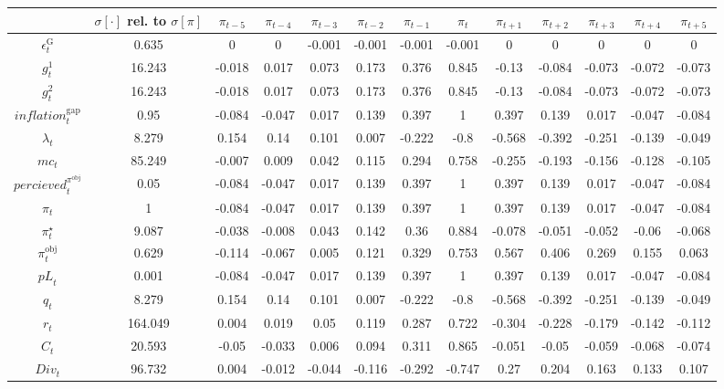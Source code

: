 \begin{tabular}{c|c|c|c|c|c|c|c|c|c|c|c|c|}
  & $\sigma[\cdot]$ rel. to $\sigma[\pi]$ & $\pi_{t-5}$ & $\pi_{t-4}$ & $\pi_{t-3}$ & $\pi_{t-2}$ & $\pi_{t-1}$ & $\pi_{t}$ & $\pi_{t+1}$ & $\pi_{t+2}$ & $\pi_{t+3}$ & $\pi_{t+4}$ & $\pi_{t+5}$\\
\hline
$\epsilon^{\mathrm{G}}_{t}$ & 0.635 & 0 & 0 & -0.001 & -0.001 & -0.001 & -0.001 & 0 & 0 & 0 & 0 & 0 \\
$g^{\mathrm{1}}_{t}$ & 16.243 & -0.018 & 0.017 & 0.073 & 0.173 & 0.376 & 0.845 & -0.13 & -0.084 & -0.073 & -0.072 & -0.073 \\
$g^{\mathrm{2}}_{t}$ & 16.243 & -0.018 & 0.017 & 0.073 & 0.173 & 0.376 & 0.845 & -0.13 & -0.084 & -0.073 & -0.072 & -0.073 \\
${i\!n\!f\!l\!a\!t\!i\!o\!n}^{\mathrm{gap}}_{t}$ & 0.95 & -0.084 & -0.047 & 0.017 & 0.139 & 0.397 & 1 & 0.397 & 0.139 & 0.017 & -0.047 & -0.084 \\
$\lambda_{t}$ & 8.279 & 0.154 & 0.14 & 0.101 & 0.007 & -0.222 & -0.8 & -0.568 & -0.392 & -0.251 & -0.139 & -0.049 \\
${m\!c}_{t}$ & 85.249 & -0.007 & 0.009 & 0.042 & 0.115 & 0.294 & 0.758 & -0.255 & -0.193 & -0.156 & -0.128 & -0.105 \\
${p\!e\!r\!c\!i\!e\!v\!e\!d}^{\pi^{\mathrm{obj}}}_{t}$ & 0.05 & -0.084 & -0.047 & 0.017 & 0.139 & 0.397 & 1 & 0.397 & 0.139 & 0.017 & -0.047 & -0.084 \\
$\pi_{t}$ & 1 & -0.084 & -0.047 & 0.017 & 0.139 & 0.397 & 1 & 0.397 & 0.139 & 0.017 & -0.047 & -0.084 \\
$\pi^{\star}_{t}$ & 9.087 & -0.038 & -0.008 & 0.043 & 0.142 & 0.36 & 0.884 & -0.078 & -0.051 & -0.052 & -0.06 & -0.068 \\
$\pi^{\mathrm{obj}}_{t}$ & 0.629 & -0.114 & -0.067 & 0.005 & 0.121 & 0.329 & 0.753 & 0.567 & 0.406 & 0.269 & 0.155 & 0.063 \\
${p\!L}_{t}$ & 0.001 & -0.084 & -0.047 & 0.017 & 0.139 & 0.397 & 1 & 0.397 & 0.139 & 0.017 & -0.047 & -0.084 \\
$q_{t}$ & 8.279 & 0.154 & 0.14 & 0.101 & 0.007 & -0.222 & -0.8 & -0.568 & -0.392 & -0.251 & -0.139 & -0.049 \\
$r_{t}$ & 164.049 & 0.004 & 0.019 & 0.05 & 0.119 & 0.287 & 0.722 & -0.304 & -0.228 & -0.179 & -0.142 & -0.112 \\
$C_{t}$ & 20.593 & -0.05 & -0.033 & 0.006 & 0.094 & 0.311 & 0.865 & -0.051 & -0.05 & -0.059 & -0.068 & -0.074 \\
${D\!i\!v}_{t}$ & 96.732 & 0.004 & -0.012 & -0.044 & -0.116 & -0.292 & -0.747 & 0.27 & 0.204 & 0.163 & 0.133 & 0.107 \\

\end{tabular}
